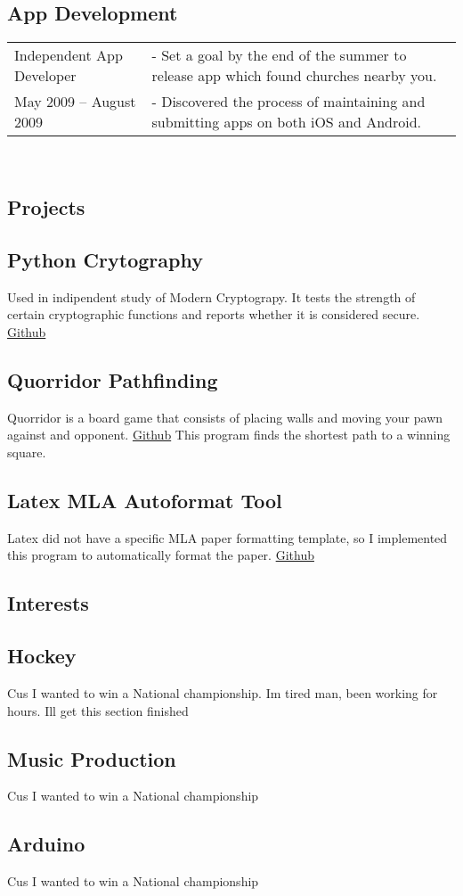 \documentclass{article}[11pt]
\begin{document}
	\subsection*{App Development}
	\begin{tabular}{l l}
	Independent App Developer	& - Set a goal by the end of the summer to release app which found churches nearby you. \\
	May 2009 -- August 2009 	& - Discovered the process of maintaining and submitting apps on both iOS and Android.
	\end{tabular}\\
\begin{multicols}{2}
	\section*{Projects}
	\subsection*{Python Crytography}
		Used in indipendent study of Modern Cryptograpy.
		It tests the strength of certain cryptographic functions
		and reports whether it is considered secure. \href{https://github.com/bizzk3t/PythonCrypto}{Github}
		\subsection*{Quorridor Pathfinding}
		Quorridor is a board game that consists of placing walls and moving your pawn against
		and opponent. \href{https://github.com/bizzk3t/Graph}{Github}
		This program finds the shortest path to a winning square.
		\subsection*{Latex MLA Autoformat Tool}
		Latex did not have a specific MLA paper formatting template, so I implemented this program to automatically format the paper. \href{https://github.com/bizzk3t/LatexMLA}{Github}
\end{multicols}
\begin{multicols}{2}
	\section*{Interests}
	\subsection*{Hockey}
	Cus I wanted to win a National championship. Im tired man, been working for hours. Ill get this section finished
	\subsection*{Music Production}
	Cus I wanted to win a National championship
	\subsection*{Arduino}
	Cus I wanted to win a National championship
\end{multicols}



\begin{comment}

		{\fontsize{40}{40}\selectfont Will Harrison} \\
\end{comment}
\end{document}
